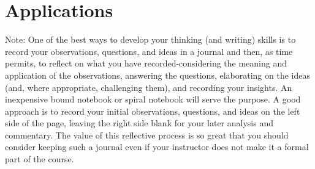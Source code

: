 \documentclass{book}
\begin{document}
\section{Applications}

Note: One of the best ways to develop your thinking (and writing) skills is to record your observations, questions, and ideas in a journal and then, as time permits, to reflect on what you have recorded-considering the meaning and application of the observations, answering the questions, elaborating on the ideas (and, where appropriate, challenging them), and recording your insights. An inexpensive bound notebook or spiral notebook will serve the purpose. A good approach is to record your initial observations, questions, and ideas on the left side of the page, leaving the right side blank for your later analysis and commentary. The value of this reflective process is so great that you should consider keeping such a journal even if your instructor does not make it a formal part of the course.
\end{document}
